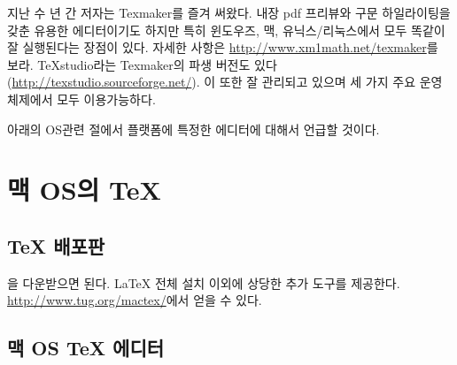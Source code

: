 지난 수 년 간 저자는 Texmaker를 즐겨 써왔다. 내장 pdf 프리뷰와 구문 하일라이팅을 갖춘 유용한 에디터이기도 하지만 
특히 윈도우즈, 맥, 유닉스/리눅스에서 모두 똑같이 잘 실행된다는 장점이 있다.
자세한 사항은 \url{http://www.xm1math.net/texmaker}를 보라.
TeXstudio라는 Texmaker의 파생 버전도 있다 (\url{http://texstudio.sourceforge.net/}).
이 또한 잘 관리되고 있으며 세 가지 주요 운영체제에서 모두 이용가능하다.


아래의 OS관련 절에서 플랫폼에 특정한 에디터에 대해서 언급할 것이다.

\section{맥 OS의 \TeX}

\subsection{\TeX{} 배포판}

을 다운받으면 된다. \LaTeX{} 전체 설치 이외에 상당한 추가 도구를 제공한다.
\url{http://www.tug.org/mactex/}에서 얻을 수 있다.

\subsection{맥 OS \TeX{} 에디터}

